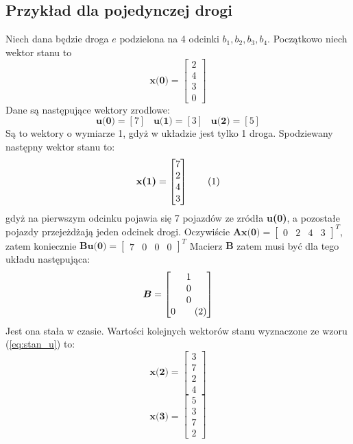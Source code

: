 \documentclass[12pt]{book}
\theoremstyle{plain}
\newcommand\addtag{\refstepcounter{equation}
\renewcommand{\labelenumii}{\theenumii}
\renewcommand{\theenumii}{\theenumi.\arabic{enumii}.}
\tag{\theequation}}
\begin{document}
\subsection{Przykład dla pojedynczej drogi}
Niech dana będzie droga $e$ podzielona na 4 odcinki $b_1,b_2,b_3,b_4$. Początkowo niech wektor stanu to
\[\textbf{x(0)}=\begin{bmatrix} 2 \\ 4 \\ 3 \\ 0 \end{bmatrix} \]
Dane są następujące wektory zrodlowe:
\[\textbf{u(0)}=[7] \;\;\; \textbf{u(1)}=[3] \;\;\; \textbf{u(2)}=[5]\]
Są to wektory o wymiarze 1, gdyż w układzie jest tylko 1 droga.
Spodziewany następny wektor stanu to:\[\textbf{x(1)}=\begin{bmatrix} 7 \\ 2 \\ 4 \\ 3 \end{bmatrix} \addtag \] gdyż na pierwszym odcinku pojawia się 7 pojazdów ze zródła \textbf{u(0)}, a pozostałe pojazdy przejeżdżają jeden odcinek drogi. Oczywiście $\textbf{Ax(0)}=\begin{bmatrix} 0 & 2 & 4 & 3 \end{bmatrix}^T$, zatem koniecznie
$\textbf{Bu(0)}= \begin{bmatrix} 7 & 0 & 0 & 0 \end{bmatrix}^T$
Macierz $\boldsymbol{B}$ zatem musi być dla tego układu następująca:
\[\boldsymbol{B}=\begin{bmatrix}
1 \\ 0 \\ 0 \\ 0 \addtag
\end{bmatrix}\]
Jest ona stała w czasie. Wartości kolejnych wektorów stanu wyznaczone ze wzoru (\ref{eq:stan_u}) to:
\[\textbf{x(2)}=\begin{bmatrix}
3 \\ 7 \\ 2 \\ 4 
\end{bmatrix}\]
\[\textbf{x(3)}=\begin{bmatrix}
5 \\ 3 \\ 7 \\ 2 
\end{bmatrix}\]
\end{document}
